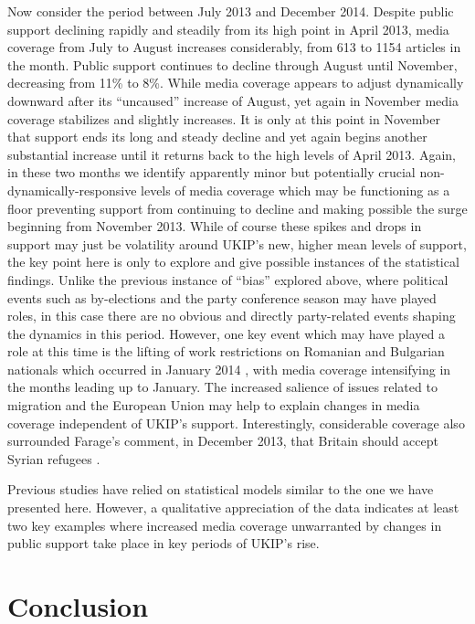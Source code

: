 \documentclass[12pt,]{article}
\begin{document}
Now consider the period between July 2013 and December 2014. Despite
public support declining rapidly and steadily from its high point in
April 2013, media coverage from July to August increases considerably,
from 613 to 1154 articles in the month. Public support continues to
decline through August until November, decreasing from 11\% to 8\%.
While media coverage appears to adjust dynamically downward after its
``uncaused'' increase of August, yet again in November media coverage
stabilizes and slightly increases. It is only at this point in November
that support ends its long and steady decline and yet again begins
another substantial increase until it returns back to the high levels of
April 2013. Again, in these two months we identify apparently minor but
potentially crucial non-dynamically-responsive levels of media coverage
which may be functioning as a floor preventing support from continuing
to decline and making possible the surge beginning from November 2013.
While of course these spikes and drops in support may just be volatility
around UKIP's new, higher mean levels of support, the key point here is
only to explore and give possible instances of the statistical findings.
Unlike the previous instance of ``bias'' explored above, where political
events such as by-elections and the party conference season may have
played roles, in this case there are no obvious and directly
party-related events shaping the dynamics in this period. However, one
key event which may have played a role at this time is the lifting of
work restrictions on Romanian and Bulgarian nationals which occurred in
January 2014 \citep{martin_immigration_2013}, with media coverage
intensifying in the months leading up to January. The increased salience
of issues related to migration and the European Union may help to
explain changes in media coverage independent of UKIP's support.
Interestingly, considerable coverage also surrounded Farage's comment,
in December 2013, that Britain should accept Syrian refugees
\citep{goodman_does_2013}.

Previous studies have relied on statistical models similar to the one we
have presented here. However, a qualitative appreciation of the data
indicates at least two key examples where increased media coverage
unwarranted by changes in public support take place in key periods of
UKIP's rise.

\section{Conclusion}\label{conclusion}
\end{document}
